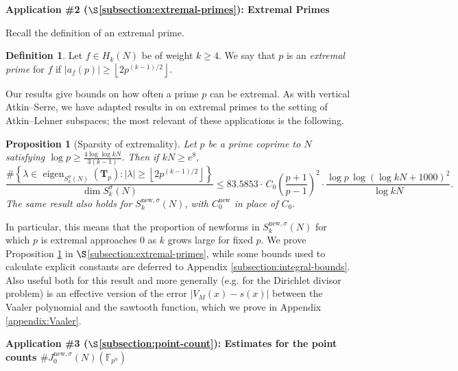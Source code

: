 \documentclass[11pt,letterpaper,reqno]{amsart}
\newtheorem{proposition}[theorem]{Proposition}
\theoremstyle{definition}
\newtheorem{definition}[theorem]{Definition}
\numberwithin{equation}{section}
\numberwithin{figure}{section}
\numberwithin{table}{section}
\newcommand{\nw}{\mathrm{new}}
\begin{document}
\vspace{4mm}
\textbf{Application \#2 ($\S$\ref{subsection:extremal-primes}): Extremal Primes}

Recall the definition of an extremal prime.

\begin{definition}\label{def:extremal-prime}
    Let $f \in H_k (N)$ be of weight $k \geq 4.$ We say that $p$ is an \textit{extremal prime} for $f$ if
    $\left| a_f(p)  \right| \geq \left\lfloor 2 p^{(k - 1)/2} \right\rfloor.$
\end{definition}

Our results give bounds on how often a prime $p$ can be extremal. As with vertical Atkin--Serre, we have adapted results in \cite{Kim24} on extremal primes to the setting of Atkin--Lehner subspaces; the most relevant of these applications is the following.

\begin{proposition}[Sparsity of extremality] \label{prop:k-dependent-extremality}
    Let $p$ be a prime coprime to $N$ satisfying $\log p \geq \frac{4\log \log  kN}{3(k - 1)}.$ Then if $kN \geq e^8,$
    $$\frac{\#\left\{ \lambda \in \operatorname{eigen}_{ S_k^\sigma(N)} \! \left( \mathbf{T}_{p}  \right) :  |\lambda|  \geq \left\lfloor 2 p^{(k - 1)/2}  \right\rfloor \right\}}{\dim S_k^\sigma(N)} \leq 83.5853 \cdot \, C_0 \left( \frac{p + 1}{p - 1} \right)^2  \cdot \frac{ \log p \,  \log \left(  \log kN + 1000 \right)^2}{\log kN}.$$
    The same result also holds for $S_k^{\nw, \sigma}(N)$, with $C_0^\nw$ in place of $C_0.$
\end{proposition}

In particular, this means that the proportion of newforms in $S_k^{\nw,\sigma}(N)$ for which $p$ is extremal approaches $0$ as $k$ grows large for fixed $p$. We prove Proposition \ref{prop:k-dependent-extremality} in $\S$\ref{subsection:extremal-primes}, while some bounds used to calculate explicit constants are deferred to Appendix \ref{subsection:integral-bounds}. Also useful both for this result and more generally (e.g. for the Dirichlet divisor problem) is an effective version of the error $|V_M(x) - s(x)|$ between the Vaaler polynomial and the sawtooth function, which we prove in Appendix \ref{appendix:Vaaler}.

\vspace{4mm}
\textbf{Application \#3 ($\S$\ref{subsection:point-count}): Estimates for the point counts $\# J_0^{\nw, \sigma}(N)(\mathbb{F}_{p^n})$ }
\end{document}
